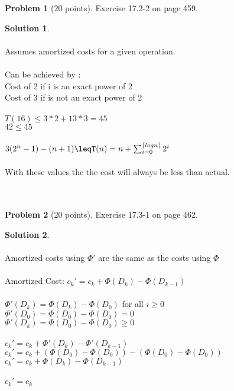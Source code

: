 \documentclass{article}
\DeclarePairedDelimiter{\ceil}{\lceil}{\rceil}
\theoremstyle{definition}
\newtheorem{problem}{Problem}
\newtheorem*{solution}{Solution}
\begin{document}
\newpage

\begin{problem}[20 points]
Exercise 17.2-2 on page 459.
\end{problem}
\begin{solution} \\
\\
Assumes amortized costs for a given operation.\\
\\
Can be achieved by :\\
Cost of 2 if i is an exact power of 2\\
Cost of 3 if is not an exact power of 2\\
\\
$T(16) \leq 3*2 + 13*3 = 45 $\\
$42 \leq 45$\\
\\
$ 3(2^n -1) - (n + 1)\leqT(n) = n + \sum_{i=0}^{\ceil{logn}} 2^{i}$   \\
\\
With these values the the cost will always be less than actual.
\\ \\ \\
\end{solution}


\begin{problem}[20 points]
Exercise 17.3-1 on page 462.
\end{problem}
\begin{solution} \\
\\
Amortized costs using $\Phi'$ are the same as the costs using $\Phi$\\
\\
Amortized Cost: $c_k' = c_k + \Phi(D_k) - \Phi(D_{k-1})$\\
\\
$\Phi'(D_k) = \Phi(D_k) - \Phi(D_{0})$ for all $i \geq 0$\\
$\Phi'(D_0) = \Phi(D_0) - \Phi(D_{0}) = 0$\\
$\Phi'(D_k) = \Phi(D_0) - \Phi(D_{0})  \geq 0$\\
\\
$c_k' = c_k + \Phi'(D_k) - \Phi'(D_{k-1})$\\
$c_k' = c_k + (\Phi(D_0) - \Phi(D_{0})) - ( \Phi(D_0) - \Phi(D_{0}) )$\\
$c_k' = c_k + \Phi(D_k) - \Phi(D_{k-1})$\\
\therefore\\
$c_k' = c_k$\\


\end{solution}
\end{document}
